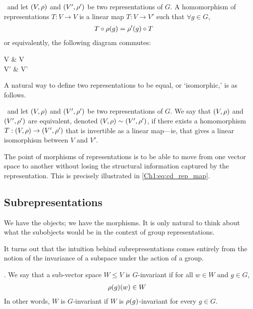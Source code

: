 \begin{boxdefinition}
    \ and let $\left( V,\rho \right)$ and $\left( V',\rho' \right)$ be two representations of $G$. A homomorphism of representations $T : V \to V$ is a linear map $T : V \to V'$ such that $\forall g \in G$,
    \begin{align*}
        T \circ \rho\!\left( g \right) &= \rho'(g) \circ T
    \end{align*}
    or equivalently, the following diagram commutes:
    \begin{cd}
        V \arrow[r, "\rho(g)"] \arrow[d, "T"'] & V \arrow[d, "T"] \\
        V' \arrow[r, "\rho'(g)"'] & V'
        \label{Ch1:eq:cd_rep_map}
    \end{cd}
\end{boxdefinition}

A natural way to define two representations to be equal, or `isomorphic,' is as follows.

\begin{definition}
    \ and let $\left( V,\rho \right)$ and $\left( V',\rho' \right)$ be two representations of $G$. We say that $\left( V,\rho \right)$ and $\left( V',\rho' \right)$ are equivalent, denoted $\left( V,\rho \right) \sim \left( V',\rho' \right)$, if there exists a homomorphism $T : \left( V,\rho \right) \to \left( V',\rho' \right)$ that is invertible as a linear map---ie, that gives a linear isomorphism between $V$ and $V'$.
\end{definition}

The point of morphisms of representations is to be able to move from one vector space to another without losing the structural information captured by the representation. This is precisely illustrated in \eqref{Ch1:eq:cd_rep_map}.

\subsection{Subrepresentations}

We have the objects; we have the morphisms. It is only natural to think about what the subobjects would be in the context of group representations.

It turns out that the intuition behind subrepresentations comes entirely from the notion of the invariance of a subspace under the action of a group.

\begin{definition}[$G$-Invariance]
    . We say that a sub-vector space $W \leq V$ is $G$-invariant if for all $w \in W$ and $g \in G$,
    \begin{align*}
        \rho\!\left( g \right)\!(w) \in W
    \end{align*}
    In other words, $W$ is $G$-invariant if $W$ is $\rho\!\left( g \right)$-invariant for every $g \in G$.
\end{definition}

